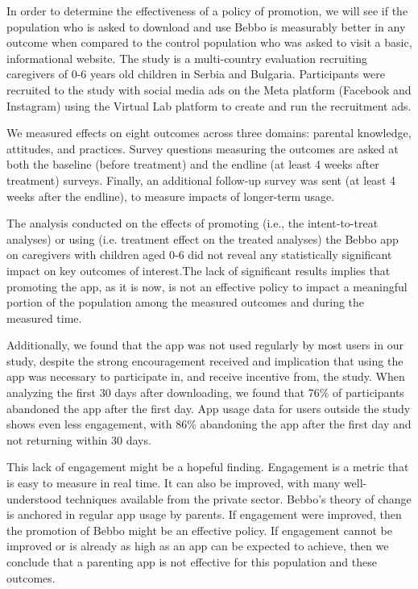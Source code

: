\documentclass{article}
\begin{document}
\vspace{2cm}

In order to determine the effectiveness of a policy of promotion, we will see if the population who is asked to download and use Bebbo is measurably better in any outcome when compared to the control population who was asked to visit a basic, informational website. The study is a multi-country evaluation recruiting caregivers of 0-6 years old children in Serbia and Bulgaria. Participants were recruited to the study with social media ads on the Meta platform (Facebook and Instagram) using the Virtual Lab platform to create and run the recruitment ads.

We measured effects on eight outcomes across three domains: parental knowledge, attitudes, and practices. Survey questions measuring the outcomes are asked at both the baseline (before treatment) and the endline (at least 4 weeks after treatment) surveys. Finally, an additional follow-up survey was sent (at least 4 weeks after the endline), to measure impacts of longer-term usage.

The analysis conducted on the effects of promoting (i.e., the intent-to-treat analyses) or using (i.e. treatment effect on the treated analyses) the Bebbo app on caregivers with children aged 0-6 did not reveal any statistically significant impact on key outcomes of interest.The lack of significant results implies that promoting the app, as it is now, is not an effective policy to impact a meaningful portion of the population among the measured outcomes and during the measured time.

Additionally, we found that the app was not used regularly by most users in our study, despite the strong encouragement received and implication that using the app was necessary to participate in, and receive incentive from, the study. When analyzing the first 30 days after downloading, we found that 76\% of participants abandoned the app after the first day. App usage data for users outside the study shows even less engagement, with 86\% abandoning the app after the first day and not returning within 30 days.

This lack of engagement might be a hopeful finding. Engagement is a metric that is easy to measure in real time. It can also be improved, with many well-understood techniques available from the private sector. Bebbo’s theory of change is anchored in regular app usage by parents. If engagement were improved, then the promotion of Bebbo might be an effective policy. If engagement cannot be improved or is already as high as an app can be expected to achieve, then we conclude that a parenting app is not effective for this population and these outcomes.
\end{document}
